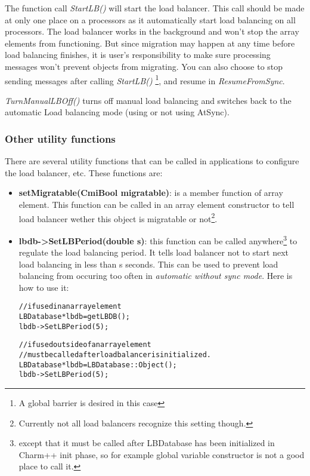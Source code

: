 \begin{enumerate}
The function call {\em StartLB()} will start the load balancer. 
This call should be made at only one place on a processors as it automatically 
start load balancing on all processors. The load balancer works in 
the background and won't stop the array elements from functioning. 
But since migration may happen at any time before load balancing finishes,
it is user's responsibility to make sure processing messages won't 
prevent objects from migrating. You can also choose to stop sending messages 
after calling {\em StartLB()}
\footnote{A global barrier is desired in this case}, and resume 
in {\em ResumeFromSync}.

{\em TurnManualLBOff()} turns off manual load balancing and 
switches back to the automatic Load balancing mode (using or not using AtSync). 

\end{enumerate}

\subsubsection{Other utility functions}

There are several utility functions that can be called in applications to
configure the load balancer, etc. These functions are:

\begin{itemize}
\item {\bf setMigratable(CmiBool migratable)}: is a member function of array
      element. This function can be called 
      in an array element constructor to tell load balancer wether this object
      is migratable or not\footnote{Currently not all load balancers 
      recognize this setting though.}.
\item {\bf lbdb->SetLBPeriod(double s)}: this function can be called 
      anywhere\footnote{except that it must be called after LBDatabase 
      has been initialized in Charm++ init phase, so for example global 
      variable constructor is not a good place to call it.} to regulate 
      the load balancing period. It tells load balancer not to start next 
      load balancing in less than s seconds. This can be used to prevent 
      load balancing from occuring too often in 
      {\em automatic without sync mode}. Here is how to use it:
      \begin{alltt}
// if used in an array element
LBDatabase *lbdb = getLBDB();
lbdb->SetLBPeriod(5);

// if used outside of an array element
// must be called after load balancer is initialized.
LBDatabase *lbdb = LBDatabase::Object();
lbdb->SetLBPeriod(5);
\end{alltt}
\end{itemize}


